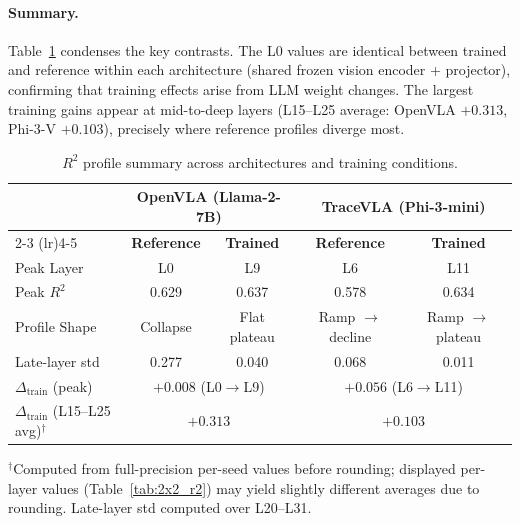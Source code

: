 \paragraph{Summary.}
Table~\ref{tab:2x2_r2_summary} condenses the key contrasts.
The L0 values are identical between trained and reference within each architecture (shared frozen vision encoder + projector), confirming that training effects arise from LLM weight changes.
The largest training gains appear at mid-to-deep layers (L15--L25 average: OpenVLA $+0.313$, Phi-3-V $+0.103$), precisely where reference profiles diverge most.

\begin{table}[h]
\centering
\caption{$R^2$ profile summary across architectures and training conditions.}
\label{tab:2x2_r2_summary}
\begin{tabular}{lcccc}
\toprule
 & \multicolumn{2}{c}{\textbf{OpenVLA (Llama-2-7B)}} & \multicolumn{2}{c}{\textbf{TraceVLA (Phi-3-mini)}} \\
\cmidrule(lr){2-3} \cmidrule(lr){4-5}
 & \textbf{Reference} & \textbf{Trained} & \textbf{Reference} & \textbf{Trained} \\
\midrule
Peak Layer       & L0          & L9          & L6          & L11         \\
Peak $R^2$       & 0.629       & 0.637       & 0.578       & 0.634       \\
Profile Shape    & Collapse    & Flat plateau & Ramp $\to$ decline & Ramp $\to$ plateau \\
Late-layer std   & 0.277       & 0.040       & 0.068       & 0.011       \\
$\Delta_{\text{train}}$ (peak) & \multicolumn{2}{c}{$+0.008$ (L0$\to$L9)} & \multicolumn{2}{c}{$+0.056$ (L6$\to$L11)} \\
$\Delta_{\text{train}}$ (L15--L25 avg)$^\dagger$ & \multicolumn{2}{c}{$+0.313$} & \multicolumn{2}{c}{$+0.103$} \\
\bottomrule
\end{tabular}
\vspace{2pt}
{\footnotesize $^\dagger$Computed from full-precision per-seed values before rounding; displayed per-layer values (Table~\ref{tab:2x2_r2}) may yield slightly different averages due to rounding. Late-layer std computed over L20--L31.}
\end{table}

